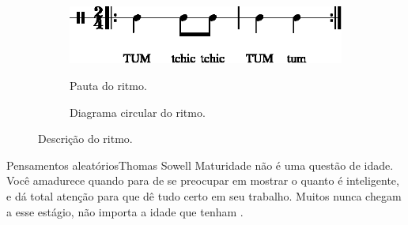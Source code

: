 \begin{figure}[H]
\centering
     \begin{subfigure}[c]{0.45\textwidth}
         \centering
         \href{https://drive.google.com/file/d/18Yxz0FwLtXPOD6o5aYRJC10g5i6EZy4E/view?usp=sharing}{\includegraphics[width=\textwidth]{chapters/cap-musicalidade-percepcion/treino-ritmo6-1.eps}}
         \caption{Pauta do ritmo.}
         \label{fig:Ritmocomplexo2:1}
     \end{subfigure}
     \hfill
     \begin{subfigure}[c]{0.45\textwidth}
         \centering
{}
         \caption{Diagrama circular do ritmo.}
         \label{fig:Ritmocomplexo2:2}
     \end{subfigure}
\caption{Descrição do ritmo.}
\label{fig:abc-percepcionritmica6}
\end{figure}


\begin{FraseOutros}{Pensamentos aleatórios}{Thomas Sowell} %
Maturidade não é uma questão de idade. Você amadurece quando para de se preocupar em mostrar o quanto é inteligente, e dá total atenção para que dê tudo certo em seu trabalho. Muitos nunca chegam a esse estágio, não importa a idade que tenham  \cite{sowell1999barbarians}.
\end{FraseOutros}

